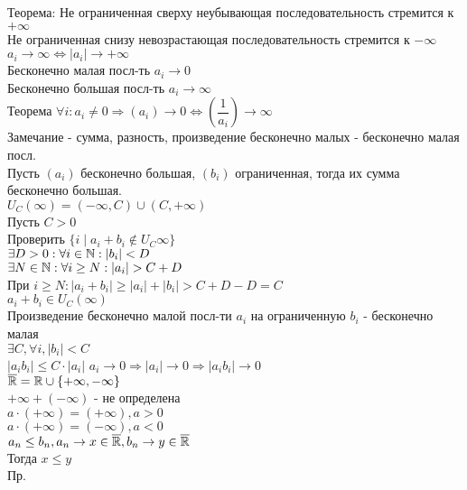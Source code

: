 Теорема: Не ограниченная сверху неубывающая последовательность стремится к $ + \infty $ \\
Не ограниченная снизу невозрастающая последовательность стремится к $ -\infty $ \\
$ a_i \rightarrow \infty \Leftrightarrow |a_i | \rightarrow +\infty $ \\
Бесконечно малая посл-ть $ a_i \rightarrow 0 $ \\
Бесконечно большая посл-ть $ a_i \rightarrow \infty $ \\
Теорема $\forall i : a_i \neq 0 \Rightarrow (a_i) \rightarrow 0 \Leftrightarrow (\dfrac{1}{a_i}) \rightarrow \infty $\\
Замечание - сумма, разность, произведение бесконечно малых - бесконечно малая посл. \\
Пусть $(a_i) $ бесконечно большая, $(b_i) $ ограниченная, тогда их сумма бесконечно большая. \\
$ U_C(\infty) =  (-\infty, C) \cup ( C, +\infty) $ \\
Пусть $ C > 0 $ \\
Проверить $\{ i \mid a_i + b_i \notin U_C{\infty} \}$\\
$ \exists D > 0 : \forall i \in \mathbb{N}: |b_i | < D $ \\
$ \exists N \in \mathbb{N} : \forall i \geq N: |a_i| > C+D $ \\
При $ i \geq N : | a_i + b_i | \geq |a_i| + |b_i|  > C+D-D = C $ \\
$ a_i + b_i \in U_C(\infty) $ \\
Произведение бесконечно малой посл-ти $a_i$ на ограниченную $b_i$ - бесконечно малая \\
$ \exists C, \forall i, |b_i| < C $ \\
$ |a_i b_i | \leq C \cdot |a_i| $ 
$ a_i \rightarrow 0 \Rightarrow  |a_i| \rightarrow 0 \Rightarrow |a_i b_i| \rightarrow 0 $ \\
$ \overline{\mathbb{R}} = \mathbb{R} \cup \{+\infty, -\infty\} $ \\
$ +\infty + (-\infty) $ - не определена \\
$ a \cdot (+\infty) = (+\infty), a > 0 $\\
$ a \cdot (+\infty) = (-\infty), a < 0 $\\
$ a_n \leq b_n, a_n \rightarrow x \in \overline{\mathbb{R}}, b_n \rightarrow y \in \overline{\mathbb{R}} $ \\
Тогда $ x \leq y $\\
Пр. \\
